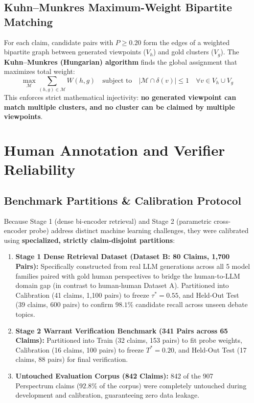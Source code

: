 \documentclass[11pt,a4paper]{article}
\begin{document}
\subsection{Kuhn--Munkres Maximum-Weight Bipartite Matching}
For each claim, candidate pairs with $P \ge 0.20$ form the edges of a weighted bipartite graph between generated viewpoints ($V_h$) and gold clusters ($V_g$). The \textbf{Kuhn--Munkres (Hungarian) algorithm} finds the global assignment that maximizes total weight:
\begin{equation}
\max_{\mathcal{M}} \sum_{(h, g) \in \mathcal{M}} W(h, g) \quad \text{subject to} \quad |\mathcal{M} \cap \delta(v)| \le 1 \quad \forall v \in V_h \cup V_g
\end{equation}
This enforces strict mathematical injectivity: \textbf{no generated viewpoint can match multiple clusters, and no cluster can be claimed by multiple viewpoints}.

\section{Human Annotation and Verifier Reliability}
\label{sec:human_annotation}

\subsection{Benchmark Partitions \& Calibration Protocol}
Because Stage 1 (dense bi-encoder retrieval) and Stage 2 (parametric cross-encoder probe) address distinct machine learning challenges, they were calibrated using \textbf{specialized, strictly claim-disjoint partitions}:
\begin{enumerate}[leftmargin=*,itemsep=1pt]
    \item \textbf{Stage 1 Dense Retrieval Dataset (Dataset B: 80 Claims, 1,700 Pairs):} Specifically constructed from real LLM generations across all 5 model families paired with gold human perspectives to bridge the human-to-LLM domain gap (in contrast to human-human Dataset A). Partitioned into Calibration (41 claims, 1,100 pairs) to freeze $\tau^* = 0.55$, and Held-Out Test (39 claims, 600 pairs) to confirm $98.1\%$ candidate recall across unseen debate topics.
    \item \textbf{Stage 2 Warrant Verification Benchmark (341 Pairs across 65 Claims):} Partitioned into Train (32 claims, 153 pairs) to fit probe weights, Calibration (16 claims, 100 pairs) to freeze $T^* = 0.20$, and Held-Out Test (17 claims, 88 pairs) for final verification.
    \item \textbf{Untouched Evaluation Corpus (842 Claims):} 842 of the 907 Perspectrum claims ($92.8\%$ of the corpus) were completely untouched during development and calibration, guaranteeing zero data leakage.
\end{enumerate}
\end{document}
